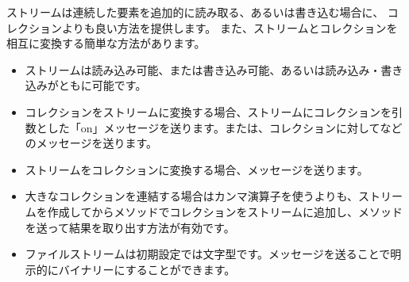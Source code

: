 \documentclass[a4paper,10pt,twoside]{book}
\begin{document}
ストリームは連続した要素を追加的に読み取る、あるいは書き込む場合に、
コレクションよりも良い方法を提供します。
また、ストリームとコレクションを相互に変換する簡単な方法があります。
\begin{itemize}
  \item ストリームは読み込み可能、または書き込み可能、あるいは読み込み・書き込みがともに可能です。
  \item コレクションをストリームに変換する場合、ストリームにコレクションを引数とした「on」メッセージを送ります。\eg {}または、コレクションに対してなどのメッセージを送ります。
  \item ストリームをコレクションに変換する場合、メッセージを送ります。
  \item 大きなコレクションを連結する場合はカンマ演算子を使うよりも、ストリームを作成してからメソッドでコレクションをストリームに追加し、メソッドを送って結果を取り出す方法が有効です。
  \item ファイルストリームは初期設定では文字型です。メッセージを送ることで明示的にバイナリーにすることができます。
\end{itemize}

\ifx\wholebook\relax\else
\end{document}
